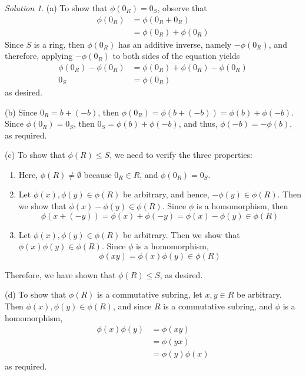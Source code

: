 \documentclass[11pt]{amsart}
\theoremstyle{definition}\newtheorem{question}{Question}
\theoremstyle{definition}\newtheorem{claim}{Claim}
\theoremstyle{remark}\newtheorem*{solution}{Solution}
\begin{document}
\begin{solution}
    (a) To show that $\phi(0_R) = 0_S$, observe that
    \begin{align*}
        \phi(0_R) &= \phi(0_R + 0_R) \\
        &= \phi(0_R) + \phi(0_R)
    \end{align*}
    Since $S$ is a ring, then $\phi(0_R)$ has an additive inverse, namely $-\phi(0_R)$, and therefore, applying $-\phi(0_R)$ to both sides of the equation yields
    \begin{align*}
        \phi(0_R) - \phi(0_R) &= \phi(0_R) + \phi(0_R) - \phi(0_R) \\
        0_S &= \phi(0_R)
    \end{align*}
    as desired.

    (b) Since $0_R = b + (-b)$, then $\phi(0_R) = \phi(b + (-b)) = \phi(b) + \phi(-b)$. Since $\phi(0_R) = 0_S$, then $0_S = \phi(b) + \phi(-b)$, and thus, $\phi(-b) = -\phi(b)$, as required.

    (c) To show that $\phi(R) \leq S$, we need to verify the three properties:
    \begin{enumerate}
        \item Here, $\phi(R) \neq \emptyset$ because $0_R \in R$, and $\phi(0_R) = 0_S$.
        \item Let $\phi(x), \phi(y) \in \phi(R)$ be arbitrary, and hence, $-\phi(y) \in \phi(R)$. Then we show that $\phi(x) - \phi(y) \in \phi(R)$. Since $\phi$ is a homomorphism, then
        \begin{equation*}
            \phi(x + (-y)) = \phi(x) + \phi(-y) = \phi(x) - \phi(y) \in \phi(R)
        \end{equation*}
        \item Let $\phi(x), \phi(y) \in \phi(R)$ be arbitrary. Then we show that $\phi(x)\phi(y) \in \phi(R)$. Since $\phi$ is a homomorphism,
        \begin{equation*}
            \phi(xy) = \phi(x)\phi(y) \in \phi(R)
        \end{equation*}
    \end{enumerate}
    Therefore, we have shown that $\phi(R) \leq S$, as desired.

    (d) To show that $\phi(R)$ is a commutative subring, let $x, y \in R$ be arbitrary. Then $\phi(x), \phi(y) \in \phi(R)$, and since $R$ is a commutative subring, and $\phi$ is a homomorphism,
    \begin{align*}
        \phi(x)\phi(y) &= \phi(xy) \\
        &= \phi(yx) \\
        &= \phi(y)\phi(x)
    \end{align*}
    as required.


\end{solution}
\end{document}

